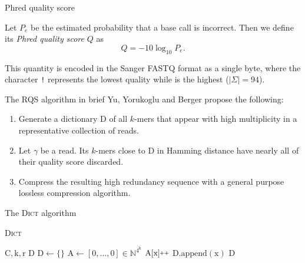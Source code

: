 \documentclass[12pt]{beamer}
\newcommand{\textapprox}{\raisebox{0.5ex}{\texttildelow}}
\newcommand{\pp}{\nolinebreak\hspace{-.05em}\raisebox{.4ex}{\tiny\bf +}\nolinebreak\raisebox{.4ex}{\tiny\bf +}\xspace}
\begin{document}
    \begin{frame}{Phred quality score}
        \begin{definition}
            Let \(P_e\) be the estimated probability that a base call is
            incorrect. Then we define its \emph{Phred quality score} \(Q\) as
            \[
                Q = -10\log_{10}{P_e}\text{.}
            \]
        \end{definition}

        \vspace{0.5cm}

        This quantity is encoded in the Sanger FASTQ format as a single byte,
        where the character \texttt{\textquotesingle!\textquotesingle}
        represents the lowest quality while
        \texttt{\textquotesingle\textapprox\textquotesingle} is the highest
        (\(\vert\Sigma\vert = 94\)).
    \end{frame}

    \begin{frame}{The RQS algorithm in brief}
        Yu, Yorukoglu and Berger \cite{YYB14} propose the following:

        \vspace{0.25cm}

        \begin{enumerate}
            \item Generate a dictionary \(\text{D}\) of all \(k\)-mers that appear
                with high multiplicity in a representative collection of reads.
            \item Let \(\gamma\) be a read. Its \(k\)-mers close to \(\text{D}\) in
                Hamming distance have nearly all of their quality score discarded.
            \item Compress the resulting high redundancy sequence with a general
                purpose lossless compression algorithm.
        \end{enumerate}
    \end{frame}

    \begin{frame}{The \textsc{Dict} algorithm}
        \begin{algorithm}[H]
            \caption{\textsc{Dict}}
            \begin{algorithmic}[1]
                \REQUIRE \(\text{C}, \text{k}, \text{r}\)
                \ENSURE \(\text{D}\)
                \STATE \(\text{D} \leftarrow \{\}\)
                \STATE \(\text{A} \leftarrow [0,\dots,0] \in \mathbb{N}^{4^\text{k}}\)
                    \STATE \(\text{A}[\text{x}]\pp\)
                \ENDFOR
                        \STATE \(\text{D}.\text{append}(\text{x})\)
                    \ENDIF
                \ENDFOR
                \RETURN \(\text{D}\)
            \end{algorithmic}
        \end{algorithm}
    \end{frame}
\end{document}
